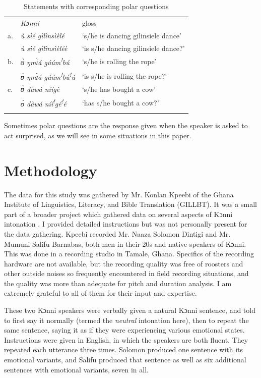 \documentclass[output=paper]{langsci/langscibook}
\begin{document}
\begin{table}
\begin{tabular}{lll} & \emph{Kɔnni } & gloss\\
\lsptoprule
a. & \emph{\`{u} sìé gìlìnsìèlé} & `s/he is dancing gilinsiele dance'\\
& \emph{ù sìé gìlìnsìèléè} & `is s/he dancing gilinsiele dance?'\\
b. & \emph{ʊ̀ ŋmɪ̀á gúúm\textsuperscript{!}bú} & `s/he is rolling the rope'\\
& \emph{ʊ̀ ŋmɪ̀á gúúm}\textit{\textsuperscript{!}}\emph{bú}\textit{\textsuperscript{!}}\emph{ú} & `is s/he is rolling the rope?'\\
c. & \emph{ʊ̀ dàwá níígè} & `s/he has bought a cow'\\
& \emph{ʊ̀ dàwá níí}\textit{\textsuperscript{!}}\emph{gé}\textit{\textsuperscript{!}}\emph{é} & `has s/he bought a cow?'\\
\lspbottomrule
\end{tabular}

\caption{Statements with corresponding polar questions}
\label{tab:1.cahill}

\end{table}



Sometimes polar questions are the response given when the speaker is asked to act surprised, as we will see in some situations in this paper. 

\section{Methodology}
The data for this study was gathered by Mr. Konlan Kpeebi of the Ghana Institute of Linguistics, Literacy, and Bible Translation (GILLBT). It was a small part of a broader project which gathered data on several aspects of Kɔnni intonation \citep{cahillforth}. I provided detailed instructions but was not personally present for the data gathering. Kpeebi recorded Mr. Naaza Solomon Dintigi and Mr. Mumuni Salifu Barnabas, both men in their 20s and native speakers of Kɔnni. This was done in a recording studio in Tamale, Ghana. Specifics of the recording hardware are not available, but the recording quality was free of roosters and other outside noises so frequently encountered in field recording situations, and the quality was more than adequate for pitch and duration analysis. I am extremely grateful to all of them for their input and expertise.


These two Kɔnni speakers were verbally given a natural Kɔnni sentence, and told to first say it normally (termed the \emph{neutral} intonation here), then to repeat the same sentence, saying it as if they were experiencing various emotional states. Instructions were given in English, in which the speakers are both fluent. They repeated each utterance three times. Solomon produced one sentence with its emotional variants, and Salifu produced that sentence as well as six additional sentences with emotional variants, seven in all.
\end{document}
